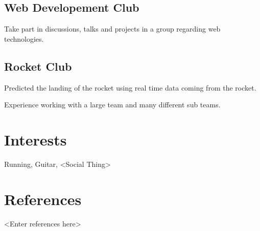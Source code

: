 \documentclass{article}
\begin{document}
\subsection{Web Developement Club}

Take part in discussions, talks and projects in a group regarding web 
technologies.

\subsection{Rocket Club}

Predicted the landing of the rocket using real time data coming from the rocket.

Experience working with a large team and many different sub teams.

\section{Interests}

Running, Guitar, <Social Thing>

\section{References}

<Enter references here>
\end{document}
